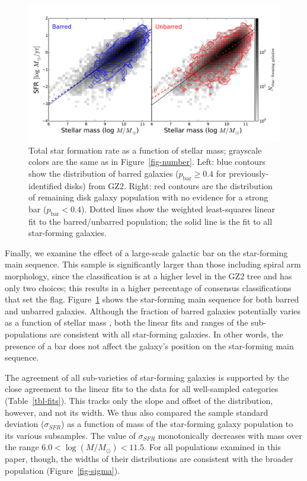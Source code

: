 \documentclass{emulateapj}
\begin{document}
\begin{figure}
\includegraphics[angle=0,width=7.0in]{figures/ms_bar_contour.pdf}
\caption{Total star formation rate as a function of stellar mass; grayscale colors are the same as in Figure~\ref{fig-number}. Left: blue contours show the distribution of barred galaxies ($p_\textrm{bar}\ge0.4$ for previously-identified disks) from GZ2. Right: red contours are the distribution of remaining disk galaxy population with no evidence for a strong bar ($p_\textrm{bar}<0.4$). Dotted lines show the weighted least-squares linear fit to the barred/unbarred population; the solid line is the fit to all star-forming galaxies. 
\label{fig-bar}}
\end{figure}

Finally, we examine the effect of a large-scale galactic bar on the star-forming main sequence. This sample is significantly larger than those including spiral arm morphology, since the classification is at a higher level in the GZ2 tree and has only two choices; this results in a higher percentage of consensus classifications that set the flag. Figure~\ref{fig-bar} shows the star-forming main sequence for both barred and unbarred galaxies. Although the fraction of barred galaxies potentially varies as a function of stellar mass \citep{mas11c}, both the linear fits and ranges of the sub-populations are consistent with all star-forming galaxies. In other words, the presence of a bar does not affect the galaxy's position on the star-forming main sequence. 

The agreement of all sub-varieties of star-forming galaxies is supported by the close agreement to the linear fits to the data for all well-sampled categories (Table~\ref{tbl-fits}). This tracks only the slope and offset of the distribution, however, and not its width. We thus also compared the sample standard deviation ($\sigma_{SFR}$) as a function of mass of the star-forming galaxy population to its various subsamples. The value of $\sigma_{SFR}$ monotonically decreases with mass over the range $6.0<\log(M/M_\odot)<11.5$. For all populations examined in this paper, though, the widths of their distributions are consistent with the broader population (Figure~\ref{fig-sigma}). 
\end{document}
